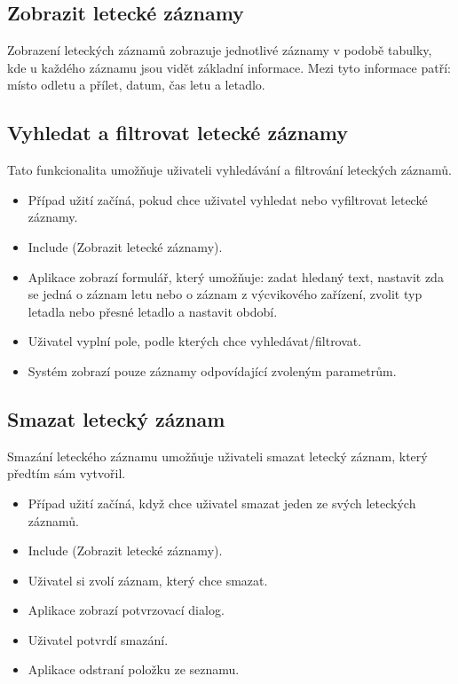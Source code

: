 \documentclass[thesis=M,czech]{FITthesis}[2012/06/26]
\begin{document}
\subsection{Zobrazit letecké záznamy}
Zobrazení leteckých záznamů zobrazuje jednotlivé záznamy v podobě tabulky, kde u každého záznamu jsou vidět základní informace. Mezi tyto informace patří: místo odletu a přílet, datum, čas letu a letadlo.

\subsection{Vyhledat a filtrovat letecké záznamy}
Tato funkcionalita umožňuje uživateli vyhledávání a filtrování leteckých záznamů.

\begin{itemize}
\item Případ užití začíná, pokud chce uživatel vyhledat nebo vyfiltrovat letecké záznamy.
\item Include (Zobrazit letecké záznamy).
\item Aplikace zobrazí formulář, který umožňuje: zadat hledaný text, nastavit zda se jedná o záznam letu nebo o záznam z výcvikového zařízení, zvolit typ letadla nebo přesné letadlo a nastavit období.
\item Uživatel vyplní pole, podle kterých chce vyhledávat/filtrovat.
\item Systém zobrazí pouze záznamy odpovídající zvoleným parametrům.
\end{itemize}

\subsection{Smazat letecký záznam}
Smazání leteckého záznamu umožňuje uživateli smazat letecký záznam, který předtím sám vytvořil.

\begin{itemize}
\item Případ užití začíná, když chce uživatel smazat jeden ze svých leteckých záznamů.
\item Include (Zobrazit letecké záznamy).
\item Uživatel si zvolí záznam, který chce smazat.
\item Aplikace zobrazí potvrzovací dialog.
\item Uživatel potvrdí smazání.
\item Aplikace odstraní položku ze seznamu.
\end{itemize}
\end{document}

